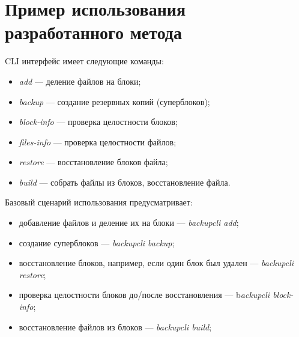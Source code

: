 \section{Пример использования разработанного метода}
\begin{flushleft}
CLI интерфейс имеет следующие команды:
\end{flushleft}
\begin{itemize}
\item \textit{add} --- деление файлов на блоки;
\item \textit{backup} --- создание резервных копий (суперблоков);
\item \textit{block-info} --- проверка целостности блоков;
\item \textit{files-info} --- проверка целостности файлов;
\item \textit{restore} --- восстановление блоков файла;
\item \textit{build} --- собрать файлы из блоков, восстановление файла.
\end{itemize}
Базовый сценарий использования предусматривает:
\begin{itemize}
\item добавление файлов и деление их на блоки --- \textit{backupcli add};
\item создание суперблоков --- \textit{backupcli backup};
\item восстановление блоков, например, если один блок был удален --- \textit{backupcli restore};
\item проверка целостности блоков до/после восстановления --- b\textit{ackupcli block-info};
\item восстановление файлов из блоков --- \textit{backupcli build};
\end{itemize}

